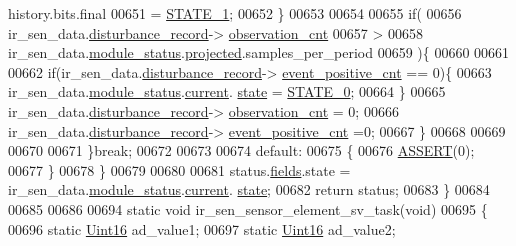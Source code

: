 \begin{DoxyCode}
      history.bits.final
00651                 = \hyperlink{a00021_a727351838367f27ac0adb9a13422c342}{STATE\_1};
00652             \}
00653 
00654 
00655              \textcolor{keywordflow}{if}(
00656                   ir\_sen\_data.\hyperlink{a00023_ac9b38e2c1d3f1013a88d33506c754152}{disturbance\_record}->
      \hyperlink{a00028_ad5b0bac02ce266b91b2b52a1c3ea1d78}{observation\_cnt}
00657                   >
00658                   ir\_sen\_data.\hyperlink{a00023_a5a53c391562b059eb744ac679f3765ca}{module\_status}.\hyperlink{a00017_a6b2516d74583418cec324c50041421c9}{projected}.samples\_per\_period
00659                )\{
00660 
00661 
00662                     \textcolor{keywordflow}{if}(ir\_sen\_data.\hyperlink{a00023_ac9b38e2c1d3f1013a88d33506c754152}{disturbance\_record}->
      \hyperlink{a00028_a7397b9d76d4b57500f27bb23d258a18a}{event\_positive\_cnt} == 0)\{
00663                        ir\_sen\_data.\hyperlink{a00023_a5a53c391562b059eb744ac679f3765ca}{module\_status}.\hyperlink{a00017_ab8af48cdbba92b3ae39c4470e53af944}{current}.
      \hyperlink{a00017_a6b8d8e916bc56265a3fd279bd26b6d1b}{state} = \hyperlink{a00021_ad6739dbbe5581cac99b7dc8a5e09949c}{STATE\_0};
00664                     \}
00665                            ir\_sen\_data.\hyperlink{a00023_ac9b38e2c1d3f1013a88d33506c754152}{disturbance\_record}->
      \hyperlink{a00028_ad5b0bac02ce266b91b2b52a1c3ea1d78}{observation\_cnt}     = 0;
00666                            ir\_sen\_data.\hyperlink{a00023_ac9b38e2c1d3f1013a88d33506c754152}{disturbance\_record}->
      \hyperlink{a00028_a7397b9d76d4b57500f27bb23d258a18a}{event\_positive\_cnt}   =0;
00667                 \}
00668 
00669    
00670 
00671         \}\textcolor{keywordflow}{break};
00672 
00673 
00674         \textcolor{keywordflow}{default}:
00675         \{
00676             \hyperlink{a00072_abb8ff8e213ac9f6fb21d2b968583b936}{ASSERT}(0);
00677         \}
00678     \}
00679 
00680 
00681     status.\hyperlink{a00021_a5296d090c085b0421fdf5a86e382abea}{fields}.state = ir\_sen\_data.\hyperlink{a00023_a5a53c391562b059eb744ac679f3765ca}{module\_status}.\hyperlink{a00017_ab8af48cdbba92b3ae39c4470e53af944}{current}.
      \hyperlink{a00017_a6b8d8e916bc56265a3fd279bd26b6d1b}{state};
00682     \textcolor{keywordflow}{return} status;
00683 \}
00684 
00685 
00686 
00694 \textcolor{keyword}{static} \textcolor{keywordtype}{void} ir\_sen\_sensor\_element\_sv\_task(\textcolor{keywordtype}{void})
00695 \{
00696     \textcolor{keyword}{static} \hyperlink{a00072_a59a9f6be4562c327cbfb4f7e8e18f08b}{Uint16} ad\_value1;
00697     \textcolor{keyword}{static} \hyperlink{a00072_a59a9f6be4562c327cbfb4f7e8e18f08b}{Uint16} ad\_value2;

\end{DoxyCode}
